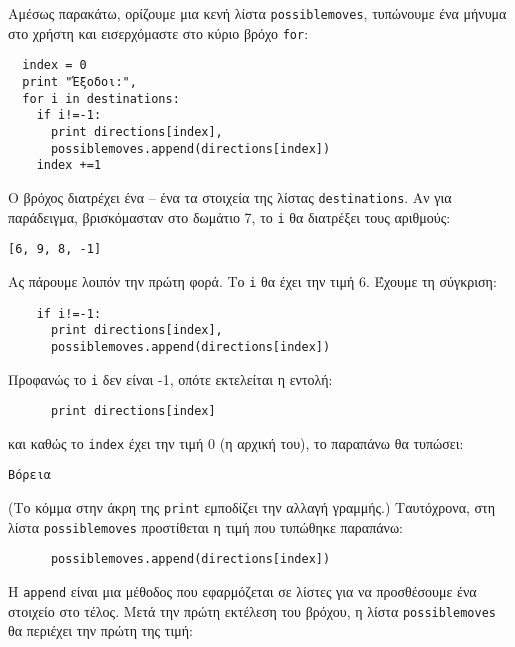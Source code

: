 Αμέσως παρακάτω, ορίζουμε μια κενή λίστα {\tt possiblemoves}, τυπώνουμε
ένα μήνυμα στο χρήστη και εισερχόμαστε στο κύριο βρόχο {\tt for}:

\begin{verbatim}
  index = 0
  print "Έξοδοι:",
  for i in destinations:
    if i!=-1:
      print directions[index],
      possiblemoves.append(directions[index])
    index +=1
\end{verbatim}

Ο βρόχος διατρέχει ένα -- ένα τα στοιχεία της λίστας {\tt destinations}. Αν για
παράδειγμα, βρισκόμασταν στο δωμάτιο 7, το {\tt i} θα διατρέξει τους
αριθμούς:

\begin{verbatim}
[6, 9, 8, -1]
\end{verbatim}

Ας πάρουμε λοιπόν την πρώτη φορά. Το {\tt i} θα έχει την τιμή 6. Έχουμε τη
σύγκριση:

\begin{verbatim}
    if i!=-1:
      print directions[index],
      possiblemoves.append(directions[index])
\end{verbatim}

Προφανώς το {\tt i} δεν είναι -1, οπότε εκτελείται η εντολή:

\begin{verbatim}
      print directions[index]
\end{verbatim}

και καθώς το {\tt index} έχει την τιμή 0 (η αρχική του), το παραπάνω θα
   τυπώσει:

\begin{verbatim}
Βόρεια
\end{verbatim}

(Το κόμμα στην άκρη της {\tt print} εμποδίζει την αλλαγή γραμμής.) Ταυτόχρονα,
 στη λίστα {\tt possiblemoves} προστίθεται η τιμή που τυπώθηκε παραπάνω:

\begin{verbatim}
      possiblemoves.append(directions[index])
\end{verbatim}

Η {\tt append} είναι μια μέθοδος που εφαρμόζεται σε λίστες για να
προσθέσουμε ένα στοιχείο στο τέλος. Μετά την πρώτη εκτέλεση του βρόχου,
η λίστα {\tt possiblemoves} θα περιέχει την πρώτη της τιμή:

